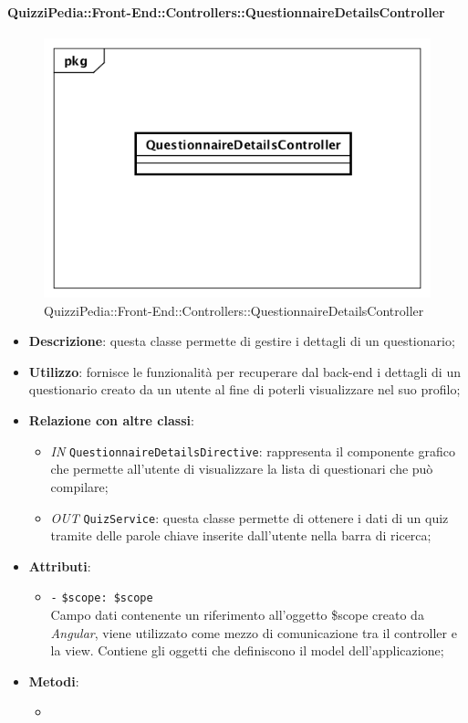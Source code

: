 \paragraph{QuizziPedia::Front-End::Controllers::QuestionnaireDetailsController}
\begin{figure}
	\centering
	\includegraphics[scale=0.45]{UML/Classi/Front-End/QuizziPedia_Front-end_Controller_QuestionnaireDetailsController.png}
	\caption{QuizziPedia::Front-End::Controllers::QuestionnaireDetailsController}
\end{figure}
\begin{itemize}
	\item \textbf{Descrizione}: questa classe permette di gestire i dettagli di un questionario; 
	\item \textbf{Utilizzo}: fornisce le funzionalità per recuperare dal back-end i dettagli di un questionario creato da un utente al fine di poterli visualizzare nel suo profilo;
	\item \textbf{Relazione con altre classi}:
	\begin{itemize}
		\item \textit{IN} \texttt{QuestionnaireDetailsDirective}: rappresenta il componente grafico che permette all'utente di visualizzare la lista di questionari che può compilare;
		\item \textit{OUT} \texttt{QuizService}: questa classe permette di ottenere i dati di un quiz tramite delle parole chiave inserite dall'utente nella barra di ricerca;
	\end{itemize}
	\item \textbf{Attributi}:
	\begin{itemize}
		\item \texttt{-} \texttt{\$scope: \$scope} \\
		Campo dati contenente un riferimento all’oggetto \$scope creato da \textit{Angular}, viene utilizzato come mezzo di comunicazione tra il controller e la view. Contiene gli oggetti che definiscono il model dell’applicazione;
	\end{itemize}
	\item \textbf{Metodi}:
	\begin{itemize}
		\item 
	\end{itemize}
\end{itemize}

